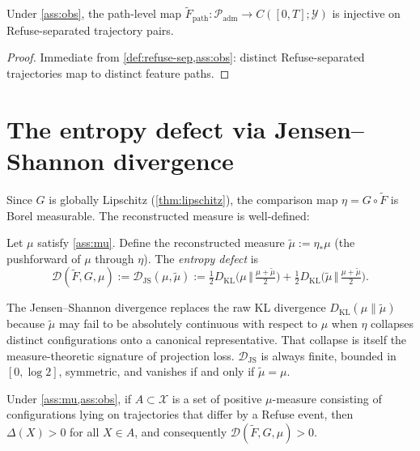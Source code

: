 \documentclass[12pt, oneside]{memoir}
\newcommand{\X}{\mathcal{X}}
\newcommand{\Ft}{\widetilde{F}}
\newcommand{\Fpath}{\widetilde{F}_{\mathrm{path}}}
\newcommand{\Padm}{\mathcal{P}_{\mathrm{adm}}}
\newcommand{\Djs}{\mathcal{D}_{\mathrm{JS}}}
\newcommand{\KL}{D_{\mathrm{KL}}}
\begin{document}
\begin{theorem}
\label{thm:injectivity}
Under \cref{ass:obs}, the path-level map $\Fpath: \Padm \to C([0,T];\mathcal{Y})$
is injective on Refuse-separated trajectory pairs.
\end{theorem}

\begin{proof}
Immediate from \cref{def:refuse-sep,ass:obs}: distinct Refuse-separated trajectories
map to distinct feature paths.
\end{proof}

\section{The entropy defect via Jensen--Shannon divergence}

Since $G$ is globally Lipschitz (\cref{thm:lipschitz}), the comparison map $\eta = G
\circ \Ft$ is Borel measurable.  The reconstructed measure is well-defined:

\begin{definition}
\label{def:defect-meas}
Let $\mu$ satisfy \cref{ass:mu}.  Define the reconstructed measure
$\tilde\mu := \eta_* \mu$ (the pushforward of $\mu$ through $\eta$).  The
\emph{entropy defect} is
\begin{equation}\label{eq:Djs}
  \mathcal{D}(\Ft, G, \mu) := \Djs(\mu, \tilde\mu) :=
  \tfrac{1}{2}\KL\!\bigl(\mu \,\Vert\, \tfrac{\mu+\tilde\mu}{2}\bigr)
  + \tfrac{1}{2}\KL\!\bigl(\tilde\mu \,\Vert\, \tfrac{\mu+\tilde\mu}{2}\bigr).
\end{equation}
\end{definition}

\begin{remark}
The Jensen--Shannon divergence replaces the raw KL divergence $\KL(\mu \| \tilde\mu)$
because $\tilde\mu$ may fail to be absolutely continuous with respect to $\mu$ when
$\eta$ collapses distinct configurations onto a canonical representative.  That collapse
is itself the measure-theoretic signature of projection loss.  $\Djs$ is always
finite, bounded in $[0, \log 2]$, symmetric, and vanishes if and only if $\tilde\mu =
\mu$.
\end{remark}

\begin{proposition}
\label{prop:defect-pos}
Under \cref{ass:mu,ass:obs}, if $A \subset \X$ is a set of positive $\mu$-measure
consisting of configurations lying on trajectories that differ by a Refuse event, then
$\Delta(X) > 0$ for all $X \in A$, and consequently $\mathcal{D}(\Ft, G, \mu) > 0$.
\end{proposition}
\end{document}

